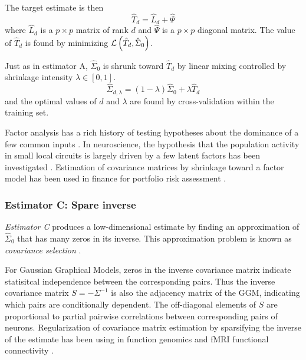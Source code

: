 The target estimate is then 
\begin{equation}
\hat T_d = \hat L_d + \hat \Psi
\end{equation}
where $\hat L_d$ is a $p\times p$ matrix of rank $d$ and $\hat \Psi$ is a $p\times p$ diagonal matrix. The value of $\hat T_d$ is found by minimizing $\mathcal L\left(\hat T_d, \hat\Sigma_0\right)$.

Just as in estimator A, $\hat\Sigma_0$ is shrunk toward $\hat T_d$ by linear mixing controlled by shrinkage intensity $\lambda\in[0,1]$.
\begin{equation}
\hat\Sigma_{d,\lambda} = (1-\lambda)\hat\Sigma_0 + \lambda\hat T_d
\end{equation}
and the optimal values of $d$ and $\lambda$ are found by cross-validation within the training set.

Factor analysis has a rich history of testing hypotheses about the dominance of a few common inputs \cite{findagoodone}.  In neuroscience, the hypothesis that the population activity in small local circuits is largely driven by a few latent factors has been investigated \cite{Yu:2009,Ecker:2013}.  Estimation of covariance matrices by shrinkage toward a factor model has been used in finance for portfolio risk assessment \cite{Ledoit:2003,Fan:2008}.

\subsubsection*{Estimator C: Spare inverse}
\emph{Estimator C} produces a low-dimensional estimate by finding an approximation of $\hat\Sigma_0$ that has many zeros in its inverse. This approximation problem is known as \emph{covariance selection} \cite{Dempster:1972}. 

For Gaussian Graphical Models, zeros in the inverse covariance matrix indicate statisitcal independence between the corresponding pairs. Thus the inverse covariance matrix $S=-\Sigma^{-1}$ is also the adjacency matrix of the GGM, indicating which pairs are conditionally dependent.   The off-diagonal elements of $S$ are proportional to partial pairwise correlations between corresponding pairs of neurons.  Regularization of covariance matrix estimation by sparsifying the inverse of the estimate has been using in function genomics \cite{Schafer:2005,other} and fMRI functional connectivity \cite{Varoquaux:2012}. 

